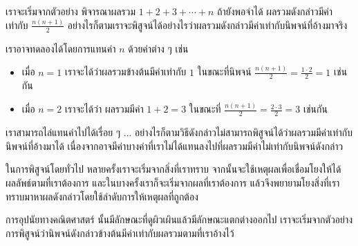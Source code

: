 เรา{\wbr}จะ{\wbr}เริ่ม{\wbr}จาก{\wbr}ตัวอย่าง พิจารณา{\wbr}ผลรวม $1+2+3+\cdots+n$ ถ้า{\wbr}ยัง{\wbr}พอ{\wbr}จำ{\wbr}ได้{\wbr}
ผลรวม{\wbr}ดังกล่าว{\wbr}มี{\wbr}ค่า{\wbr}เท่า{\wbr}กับ $\frac{n(n+1)}{2}$
อย่างไรก็ตาม{\wbr}เรา{\wbr}จะ{\wbr}พิสูจน์{\wbr}ได้{\wbr}อย่างไร{\wbr}ว่า{\wbr}ผลรวม{\wbr}ดังกล่าว{\wbr}มี{\wbr}ค่า{\wbr}เท่า{\wbr}กับ{\wbr}นิพจน์{\wbr}ที่{\wbr}อ้าง{\wbr}มา{\wbr}จริง{\wbr}

เรา{\wbr}อาจ{\wbr}ทดลอง{\wbr}ได้{\wbr}โดย{\wbr}การ{\wbr}แทน{\wbr}ค่า $ n $ ด้วย{\wbr}ค่า{\wbr}ต่าง ๆ เช่น{\wbr}

\begin{itemize}
\item เมื่อ $ n=1 $ เรา{\wbr}จะ{\wbr}ได้{\wbr}ว่า{\wbr}ผลรวม{\wbr}ข้างต้น{\wbr}มี{\wbr}ค่า{\wbr}เท่า{\wbr}กับ $ 1 $ ใน{\wbr}ขณะที่{\wbr}นิพจน์ $
  \frac{n(n+1)}{2}=\frac{1\cdot 2}{2}=1 $ เช่นกัน{\wbr}
\item เมื่อ $ n=2 $ เรา{\wbr}จะ{\wbr}ได้{\wbr}ว่า ผลรวม{\wbr}มี{\wbr}ค่า $ 1+2=3 $ ใน{\wbr}ขณะที่ $
  \frac{n(n+1)}{2}=\frac{2\cdot 3}{2}=3 $ เช่นกัน{\wbr}
\end{itemize}

เรา{\wbr}สามารถ{\wbr}ไล่{\wbr}แทน{\wbr}ค่า{\wbr}ไป{\wbr}ได้{\wbr}เรื่อย ๆ
... อย่างไรก็ตาม{\wbr}วิธี{\wbr}ดังกล่าว{\wbr}ไม่{\wbr}สามารถ{\wbr}พิสูจน์{\wbr}ได้{\wbr}ว่า{\wbr}ผลรวม{\wbr}มี{\wbr}ค่า{\wbr}เท่า{\wbr}กับ{\wbr}นิพจน์{\wbr}ที่{\wbr}อ้าง{\wbr}มา{\wbr}ได้{\wbr}
เนื่องจาก{\wbr}อาจ{\wbr}มี{\wbr}ค่า{\wbr}บาง{\wbr}ค่า{\wbr}ที่{\wbr}เรา{\wbr}ไม่{\wbr}ได้{\wbr}แทน{\wbr}ลง{\wbr}ไป{\wbr}ที่{\wbr}ผลรวม{\wbr}มี{\wbr}ค่า{\wbr}ไม่{\wbr}เท่า{\wbr}กับ{\wbr}นิพจน์{\wbr}ดังกล่าว{\wbr}

ใน{\wbr}การ{\wbr}พิสูจน์{\wbr}โดย{\wbr}ทั่วไป หลาย{\wbr}ครั้ง{\wbr}เรา{\wbr}จะ{\wbr}เริ่ม{\wbr}จาก{\wbr}สิ่ง{\wbr}ที่{\wbr}เรา{\wbr}ทราบ{\wbr}
จากนั้น{\wbr}จะ{\wbr}ใช้{\wbr}เหตุผล{\wbr}เพื่อ{\wbr}เชื่อมโยง{\wbr}ให้{\wbr}ได้{\wbr}ผลลัพธ์{\wbr}ตาม{\wbr}ที่{\wbr}เรา{\wbr}ต้องการ{\wbr}
และ{\wbr}ใน{\wbr}บาง{\wbr}ครั้ง{\wbr}เรา{\wbr}ก็{\wbr}จะ{\wbr}เริ่ม{\wbr}จาก{\wbr}ผล{\wbr}ที่{\wbr}เรา{\wbr}ต้องการ{\wbr}
แล้ว{\wbr}จึง{\wbr}พยายาม{\wbr}โยง{\wbr}สิ่ง{\wbr}ที่{\wbr}เรา{\wbr}ทราบ{\wbr}มา{\wbr}หา{\wbr}ผล{\wbr}ดังกล่าว{\wbr}โดย{\wbr}ใช้{\wbr}ลำดับ{\wbr}การ{\wbr}ให้{\wbr}เหตุผล{\wbr}ที่{\wbr}ถูกต้อง{\wbr}

การ{\wbr}อุปนัย{\wbr}ทาง{\wbr}คณิตศาสตร์ นั้น{\wbr}มี{\wbr}ลักษณะ{\wbr}ที่{\wbr}ดู{\wbr}ผิวเผิน{\wbr}แล้ว{\wbr}มี{\wbr}ลักษณะ{\wbr}แตกต่าง{\wbr}ออก{\wbr}ไป{\wbr}
เรา{\wbr}จะ{\wbr}เริ่ม{\wbr}จาก{\wbr}ตัวอย่าง{\wbr}การ{\wbr}พิสูจน์{\wbr}ว่า{\wbr}นิพจน์{\wbr}ดังกล่าว{\wbr}ข้างต้น{\wbr}มี{\wbr}ค่า{\wbr}เท่า{\wbr}กับ{\wbr}ผลรวม{\wbr}ตาม{\wbr}ที่{\wbr}เรา{\wbr}อ้าง{\wbr}ไว้{\wbr}

